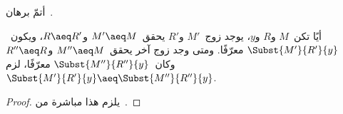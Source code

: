 \documentclass[../../../include/open-logic-section]{subfiles}
\begin{document}
\begin{prob}
  أتمّ برهان~.
\end{prob}

\begin{cor}
  أيًا تكن~$M$ و$R$ و$y$، يوجد زوج~$M'$ و$R'$ يحقق~$M' \aeq M$ و$R \aeq
  R'$،
  ويكون~$\Subst{M'}{R'}{y}$ معرّفًا. ومتى وجد زوج آخر يحقق~$M'' \aeq M$ و$R'' \aeq R$
  وكان~$\Subst{M''}{R''}{y}$ معرّفًا، لزم~$\Subst{M'}{R'}{y} \aeq \Subst{M''}{R''}{y}$.
\end{cor}

\begin{proof}
  يلزم هذا مباشرة من~.
\end{proof}
\end{document}

